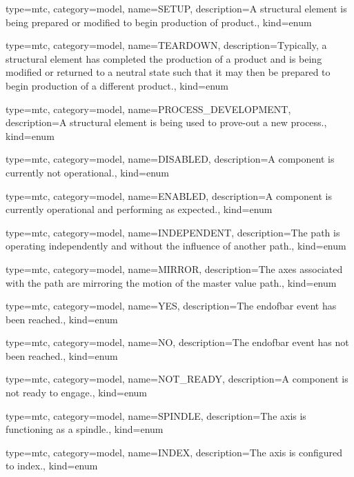 {
  type=mtc,
  category=model,
  name={SETUP},
  description={A \gls{structural element} is being prepared or modified to begin production of product.},
  kind={enum}
}


{
  type=mtc,
  category=model,
  name={TEARDOWN},
  description={Typically, a \gls{structural element} has completed the production of a product and is being modified or returned to a neutral state such that it may then be prepared to begin production of a different product.},
  kind={enum}
}


{
  type=mtc,
  category=model,
  name={PROCESS\_DEVELOPMENT},
  description={A \gls{structural element} is being used to prove-out a new process.},
  kind={enum}
}


{
  type=mtc,
  category=model,
  name={DISABLED},
  description={A component is currently not operational.},
  kind={enum}
}


{
  type=mtc,
  category=model,
  name={ENABLED},
  description={A component is currently operational and performing as expected.},
  kind={enum}
}


{
  type=mtc,
  category=model,
  name={INDEPENDENT},
  description={The path is operating independently and without the influence of another path.},
  kind={enum}
}


{
  type=mtc,
  category=model,
  name={MIRROR},
  description={The axes associated with the path are mirroring the motion of the \gls{master value} path.},
  kind={enum}
}


{
  type=mtc,
  category=model,
  name={YES},
  description={The \gls{endofbar event} has been reached.},
  kind={enum}
}


{
  type=mtc,
  category=model,
  name={NO},
  description={The \gls{endofbar event} has not been reached.},
  kind={enum}
}


{
  type=mtc,
  category=model,
  name={NOT\_READY},
  description={A component is not ready to engage.},
  kind={enum}
}


{
  type=mtc,
  category=model,
  name={SPINDLE},
  description={The axis is functioning as a spindle.},
  kind={enum}
}


{
  type=mtc,
  category=model,
  name={INDEX},
  description={The axis is configured to index.},
  kind={enum}
}


